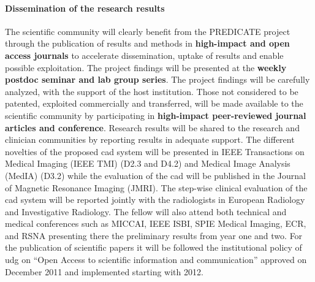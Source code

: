\paragraph{Dissemination of the research results}
The scientific community will clearly benefit from the PREDICATE project through the publication of results and methods in \textbf{high-impact and open access journals} to accelerate dissemination, uptake of results and enable possible exploitation.
The project findings will be presented at the \textbf{weekly postdoc seminar and lab group series}.
The project findings will be carefully analyzed, with the support of the host institution.
Those not considered to be patented, exploited commercially and transferred, will be made available to the scientific community by participating in \textbf{high-impact peer-reviewed journal articles and conference}.
Research results will be shared to the research and clinician communities by reporting results in adequate support.
The different novelties of the proposed \ac{cad} system will be presented in IEEE Transactions on Medical Imaging (IEEE TMI) (D2.3 and D4.2) and Medical Image Analysis (MedIA) (D3.2) while the evaluation of the \ac{cad} will be published in the Journal of Magnetic Resonance Imaging (JMRI).
The step-wise clinical evaluation of the \ac{cad} system will be reported jointly with the radiologists in European Radiology and Investigative Radiology.
The fellow will also attend both technical and medical conferences such as MICCAI, IEEE ISBI, SPIE Medical Imaging, ECR, and RSNA presenting there the preliminary results from year one and two.
For the publication of scientific papers it will be followed the institutional policy of \ac{udg} on ``Open Access to scientific information and communication'' approved on December 2011 and implemented starting with 2012.
